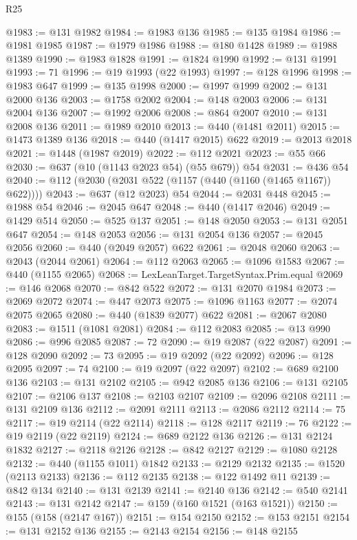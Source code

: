 \begin{lexlean}{R25}
\begin{coremodule}
@1983 := @131 @1982
@1984 := @1983 @136
@1985 := @135 @1984
@1986 := @1981 @1985
@1987 := @1979 @1986
@1988 := @180 @1428
@1989 := @1988 @1389
@1990 := @1983 @1828
@1991 := @1824 @1990
@1992 := @131 @1991
@1993 := 71
@1996 := @19 @1993 (@22 @1993)
@1997 := @128 @1996
@1998 := @1983 @647
@1999 := @135 @1998
@2000 := @1997 @1999
@2002 := @131 @2000 @136
@2003 := @1758 @2002
@2004 := @148 @2003
@2006 := @131 @2004 @136
@2007 := @1992 @2006
@2008 := @864 @2007
@2010 := @131 @2008 @136
@2011 := @1989 @2010
@2013 := @440 (@1481 @2011)
@2015 := @1473 @1389 @136
@2018 := @440 (@1417 @2015) @622
@2019 := @2013 @2018
@2021 := @1448 (@1987 @2019)
@2022 := @112 @2021
@2023 := @55 @66
@2030 := @637 (@10 (@1143 @2023 @54) (@55 @679)) @54
@2031 := @436 @54
@2040 := @112 (@2030 (@2031 @522 (@1157 (@440 (@1160 (@1465 @1167)) @622))))
@2043 := @637 (@12 @2023) @54
@2044 := @2031 @448
@2045 := @1988 @54
@2046 := @2045 @647
@2048 := @440 (@1417 @2046)
@2049 := @1429 @514
@2050 := @525 @137
@2051 := @148 @2050
@2053 := @131 @2051 @647
@2054 := @148 @2053
@2056 := @131 @2054 @136
@2057 := @2045 @2056
@2060 := @440 (@2049 @2057) @622
@2061 := @2048 @2060
@2063 := @2043 (@2044 @2061)
@2064 := @112 @2063
@2065 := @1096 @1583
@2067 := @440 (@1155 @2065)
@2068 := LexLeanTarget.TargetSyntax.Prim.equal
@2069 := @146 @2068
@2070 := @842 @522
@2072 := @131 @2070 @1984
@2073 := @2069 @2072
@2074 := @447 @2073
@2075 := @1096 @1163
@2077 := @2074 @2075 @2065
@2080 := @440 (@1839 @2077) @622
@2081 := @2067 @2080
@2083 := @1511 (@1081 @2081)
@2084 := @112 @2083
@2085 := @13 @990
@2086 := @996 @2085
@2087 := 72
@2090 := @19 @2087 (@22 @2087)
@2091 := @128 @2090
@2092 := 73
@2095 := @19 @2092 (@22 @2092)
@2096 := @128 @2095
@2097 := 74
@2100 := @19 @2097 (@22 @2097)
@2102 := @689 @2100 @136
@2103 := @131 @2102
@2105 := @942 @2085 @136
@2106 := @131 @2105
@2107 := @2106 @137
@2108 := @2103 @2107
@2109 := @2096 @2108
@2111 := @131 @2109 @136
@2112 := @2091 @2111
@2113 := @2086 @2112
@2114 := 75
@2117 := @19 @2114 (@22 @2114)
@2118 := @128 @2117
@2119 := 76
@2122 := @19 @2119 (@22 @2119)
@2124 := @689 @2122 @136
@2126 := @131 @2124 @1832
@2127 := @2118 @2126
@2128 := @842 @2127
@2129 := @1080 @2128
@2132 := @440 (@1155 @1011) @1842
@2133 := @2129 @2132
@2135 := @1520 (@2113 @2133)
@2136 := @112 @2135
@2138 := @122 @1492 @11
@2139 := @842 @134
@2140 := @131 @2139
@2141 := @2140 @136
@2142 := @540 @2141
@2143 := @131 @2142
@2147 := @159 (@160 @1521 (@163 @1521))
@2150 := @155 (@158 (@2147 @167))
@2151 := @154 @2150
@2152 := @153 @2151
@2154 := @131 @2152 @136
@2155 := @2143 @2154
@2156 := @148 @2155

\end{coremodule}
\end{lexlean}
